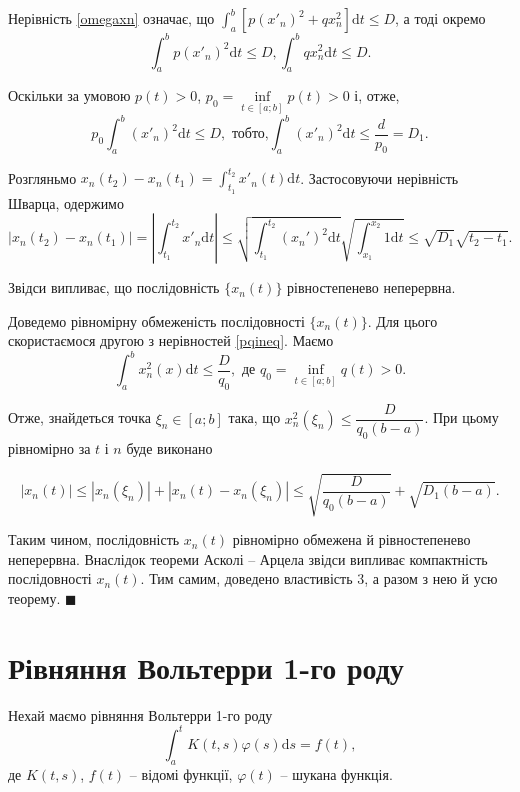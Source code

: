 \documentclass[14pt,twoside]{extreport}
\theoremstyle{mystyle}
\renewenvironment{proof}{{\bfseries Доведення.}}{$\blacksquare$}
\numberwithin{equation}{chapter}
\begin{document}
\begin{proof}
Нерівність \eqref{omegaxn} означає, що $\displaystyle \int_{a}^{b}[p(x'_n)^{2}+qx_{n}^{2}]\mathrm{d}t \leqslant D$, а тоді окремо
\begin{equation}\label{pqineq}
 \displaystyle \int_{a}^{b}p(x'_n)^{2}\mathrm{d}t \leqslant D, \displaystyle \int_{a}^{b} qx_{n}^{2}\mathrm{d}t \leqslant D.
\end{equation}

Оскільки за умовою $p(t) > 0$, $p_0 = \inf\limits_{t \in [a; b]} p(t) > 0$ і, отже,
\[
 p_0 \int_{a}^{b} (x'_n)^2 \mathrm{d}t \leqslant D, \textrm{ тобто,} \int_{a}^{b} (x'_n)^2 \mathrm{d}t \leqslant \dfrac{d}{p_0}=D_1.
\]

Розгляньмо $x_n(t_2) - x_n(t_1) = \int_{t_1}^{t_2} x'_n(t) \mathrm{d}t$. Застосовуючи нерівність Шварца, одержимо
\[
|x_{n}(t_{2})-x_{n}(t_{1})| = \left|\int_{t_{1}}^{t_{2}}x'_{n}\mathrm{d}t\right| \leqslant \sqrt{\int_{t_{1}}^{t_{2}} (x_{n}')^{2} \mathrm{d}t} \sqrt{\int_{x_{1}}^{x_{2}} 1\mathrm{d}t} \leqslant \sqrt{D_{1}}\sqrt{t_{2}-t_{1}}.
\]

Звідси випливає, що послідовність $\{x_n(t)\}$ рівностепенево неперервна.

Доведемо рівномірну обмеженість послідовності $\{x_n(t)\}$. Для цього скористаємося другою з нерівностей \eqref{pqineq}. Маємо
$$
\int_{a}^{b}x_{n}^{2}(x)\mathrm{d}t \leqslant \frac{D}{q_{0}},\textrm{ де } q_{0}=\inf\limits_{t \in [a; b]} q(t) > 0.
$$

Отже, знайдеться точка $\xi_n \in [a; b]$ така, що $x_n^2(\xi_n)\leqslant \dfrac{D}{q_0(b-a)}$. При цьому рівномірно за $t$ і $n$ буде виконано

\[
|x_{n}(t)| \leqslant |x_{n}(\xi_{n})|+|x_{n}(t)-x_{n}(\xi_{n})|\leqslant \sqrt{\frac{D}{q_{0}(b-a)}}+\sqrt{D_{1}(b-a)}.
\]

Таким чином, послідовність $x_n(t)$ рівномірно обмежена й рівностепенево неперервна. Внаслідок теореми Асколі -- Арцела звідси випливає компактність послідовності $x_n(t)$. Тим самим, доведено властивість 3, а разом з нею й усю теорему.
\end{proof}


\chapter{Рівняння Вольтерри 1-го роду}

Нехай маємо рівняння Вольтерри 1-го роду
\begin{equation}\label{volt1}
\int_{a}^{t} K(t, s) \varphi(s) \mathrm{d}s = f(t),
\end{equation}
де $K(t, s)$, $f(t)$ -- відомі функції, $\varphi(t)$ -- шукана функція.
\end{document}
